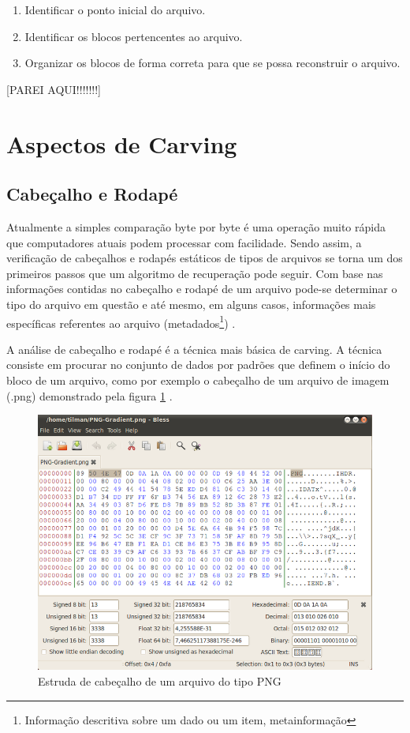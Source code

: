 \begin{enumerate}
 \item Identificar o ponto inicial do arquivo.
 \item Identificar os blocos pertencentes ao arquivo.
 \item Organizar os blocos de forma correta para que se possa reconstruir o arquivo.
\end{enumerate}

[PAREI AQUI!!!!!!!]

\section{Aspectos de Carving}

\subsection{Cabeçalho e Rodapé}
Atualmente a simples comparação byte por byte é uma operação muito rápida que computadores atuais podem processar com facilidade. Sendo assim, a verificação de cabeçalhos e rodapés estáticos de tipos de arquivos se torna um dos primeiros passos que um algoritmo de recuperação pode seguir. Com base nas informações contidas no cabeçalho e rodapé de um arquivo pode-se determinar o tipo do arquivo em questão e até mesmo, em alguns casos, informações mais específicas referentes ao arquivo (metadados\footnote{Informação descritiva sobre um dado ou um item, metainformação}) \cite{DGI}.

A análise de cabeçalho e rodapé é a técnica mais básica de carving. A técnica consiste em procurar no conjunto de dados por padrões que definem o início do bloco de um arquivo, como por exemplo o cabeçalho de um arquivo de imagem (.png) demonstrado pela figura \ref{fig:png-file-format} \cite{Kloet}.

\begin{figure}[htp]
  \centering
  \includegraphics[scale=0.5]{figuras/png-file-format.png}
  \caption{Estruda de cabeçalho de um arquivo do tipo PNG \cite{PngFileFormat}}
  \label{fig:png-file-format}
\end{figure}

